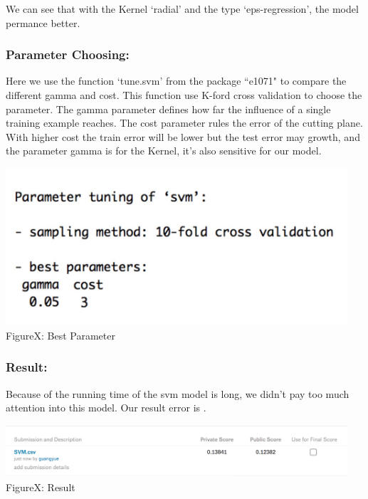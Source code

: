\documentclass[12pt]{article}
\begin{document}
	We can see that with the Kernel `radial' and the type `eps-regression', the model permance better.

	\subsubsection{Parameter Choosing:}

	Here we use the function `tune.svm' from the package ``e1071" to compare the different gamma and cost. This function use K-ford cross validation to choose the parameter. The gamma parameter defines how far the influence of a single training example reaches. The cost parameter rules the error of the cutting plane. With higher cost the train error will be lower but the test error may growth, and the parameter gamma is for the Kernel, it's also sensitive for our model.

	\begin{center}
	\includegraphics[width=5in]{svmp.jpeg}\\
	FigureX: Best Parameter
	\end{center}

	\subsubsection{Result:}

	Because of the running time of the svm model is long, we didn't pay too much attention into this model. Our result error is .

	\begin{center}
	\includegraphics[width=5in]{svmres.png}\\
	FigureX: Result
	\end{center}
\end{document}
